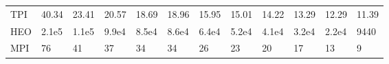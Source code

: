 \begin{table*}
{\begin{tabular}{llllllllllll}
TPI      &           40.34 &             23.41 &             20.57 &             18.69 &             18.96 &             15.95 &             15.01 &             14.22 &             13.29 &            12.29 &            11.39 \\
HEO      &           2.1e5 &             1.1e5 &             9.9e4 &             8.5e4 &             8.6e4 &             6.4e4 &             5.2e4 &             4.1e4 &             3.2e4 &            2.2e4 &             9440 \\
MPI      &              76 &                41 &                37 &                34 &                34 &                26 &                23 &                20 &                17 &               13 &                9 \\
\bottomrule
\end{tabular}}
\end{table*}
